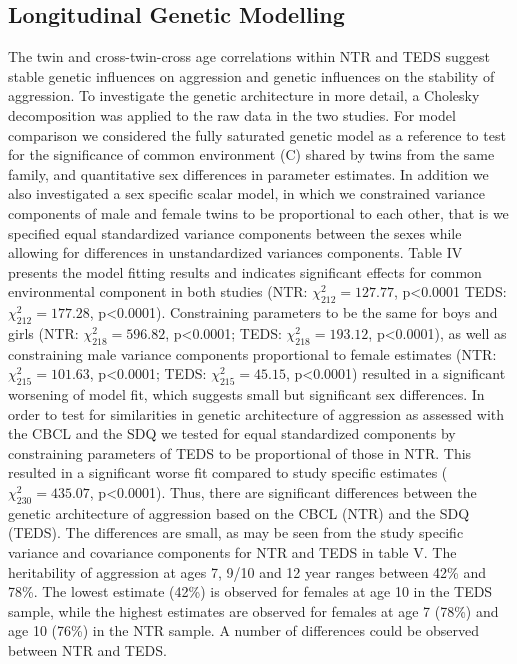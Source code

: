 \subsection{Longitudinal Genetic Modelling}
The twin and cross-twin-cross age correlations within NTR and TEDS suggest stable genetic influences on aggression and genetic influences on the stability of aggression.
To investigate the genetic architecture in more detail, a Cholesky decomposition was applied to the raw data in the two studies.
For model comparison we considered the fully saturated genetic model as a reference to test for the significance of common environment (C) shared by twins from the same family, and quantitative sex differences in parameter estimates.
In addition we also investigated a sex specific scalar model, in which we constrained variance components of male and female twins to be proportional to each other, that is we specified equal standardized variance components between the sexes while allowing for differences in unstandardized variances components.
Table IV presents the model fitting results and indicates significant effects for common environmental component in both studies (NTR: $\chi^2_{212}= 127.77$, p<0.0001 TEDS: $\chi^2_{212}= 177.28$, p<0.0001).
Constraining parameters to be the same for boys and girls (NTR: $\chi^2_{218}= 596.82$, p<0.0001; TEDS: $\chi^2_{218}= 193.12$, p<0.0001), as well as constraining male variance components proportional to female estimates (NTR: $\chi^2_{215}= 101.63$, p<0.0001; TEDS: $\chi^2_{215}= 45.15$, p<0.0001) resulted in a significant worsening of model fit, which suggests small but significant sex differences.
In order to test for similarities in genetic architecture of aggression as assessed with the CBCL and the SDQ we tested for equal standardized components by constraining parameters of TEDS to be proportional of those in NTR.
This resulted in a significant worse fit compared to study specific estimates ($\chi^2_{230}= 435.07$, p<0.0001).
Thus, there are significant differences between the genetic architecture of aggression based on the CBCL (NTR) and the SDQ (TEDS).
The differences are small, as may be seen from the study specific variance and covariance components for NTR and TEDS in table V.
The heritability of aggression at ages 7, 9/10 and 12 year ranges between 42\% and 78\%.  The lowest estimate (42\%) is observed for females at age 10 in the TEDS sample, while the highest estimates are observed for females at age 7 (78\%) and age 10 (76\%) in the NTR sample.
A number of differences could be observed between NTR and TEDS.
